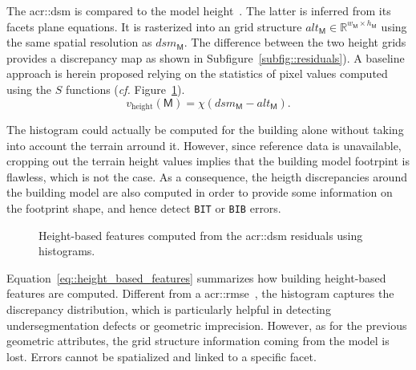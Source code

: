         The \gls{acr::dsm} is compared to the model height~\parencite{bredif20073d,zebedin2008fusion}.
        The latter is inferred from its facets plane equations.
        It is rasterized into an grid structure $alt_{\mathsf{M}} \in \mathbb{R}^{w_{\mathsf{M}} \times h_{\mathsf{M}}}$ using the same spatial resolution as $dsm_{\mathsf{M}}$.
        The difference between the two height grids provides a discrepancy map as shown in Subfigure~\ref{subfig::residuals}).
        A baseline approach is herein proposed relying on the statistics of pixel values computed using the $S$ functions (\textit{cf.} Figure~\ref{fig::height_based_features}).\\

        \begin{equation}
            \label{eq::height_based_features}
            v_{\text{height}}\left(\mathsf{M}\right) = \chi \left( dsm_{\mathsf{M}} - alt_{\mathsf{M}} \right).
        \end{equation}

        The histogram could actually be computed for the building alone without taking into account the terrain arround it.
        However, since reference data is unavailable, cropping out the terrain height values implies that the building model footrpint is flawless, which is not the case.
        As a consequence, the heigth discrepancies around the building model are also computed in order to provide some information on the footprint shape, and hence detect \texttt{BIT} or \texttt{BIB} errors.\\
        
        \begin{figure}[htpb]
            \centering
            
            \caption{
                \label{fig::height_based_features}
                Height-based features computed from the \gls{acr::dsm} residuals using histograms.
            }
        \end{figure}

        Equation~\ref{eq::height_based_features} summarizes how building height-based features are computed.
        Different from a \gls{acr::rmse}~\parencite{lafarge2012creating,poullis2013framework}, the histogram captures the discrepancy distribution, which is particularly helpful in detecting undersegmentation defects or geometric imprecision.
        However, as for the previous geometric attributes, the grid structure information coming from the model is lost.
        Errors cannot be spatialized and linked to a specific facet.

